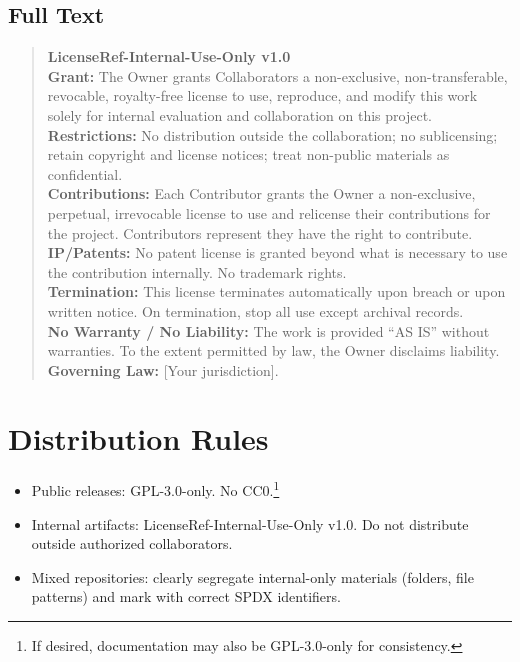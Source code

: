 \documentclass[11pt]{article}
\begin{document}
\subsection*{Full Text}
\begin{quote}\small
\textbf{LicenseRef-Internal-Use-Only v1.0}\\[0.3em]
\textbf{Grant:} The Owner grants Collaborators a non-exclusive, non-transferable, revocable, royalty-free license to use, reproduce, and modify this work solely for internal evaluation and collaboration on this project.\\
\textbf{Restrictions:} No distribution outside the collaboration; no sublicensing; retain copyright and license notices; treat non-public materials as confidential.\\
\textbf{Contributions:} Each Contributor grants the Owner a non-exclusive, perpetual, irrevocable license to use and relicense their contributions for the project. Contributors represent they have the right to contribute.\\
\textbf{IP/Patents:} No patent license is granted beyond what is necessary to use the contribution internally. No trademark rights.\\
\textbf{Termination:} This license terminates automatically upon breach or upon written notice. On termination, stop all use except archival records.\\
\textbf{No Warranty / No Liability:} The work is provided “AS IS” without warranties. To the extent permitted by law, the Owner disclaims liability.\\
\textbf{Governing Law:} [Your jurisdiction].
\end{quote}

\section*{Distribution Rules}
\begin{itemize}[leftmargin=*]
  \item Public releases: GPL-3.0-only. No CC0.\footnote{If desired, documentation may also be GPL-3.0-only for consistency.}
  \item Internal artifacts: LicenseRef-Internal-Use-Only v1.0. Do not distribute outside authorized collaborators.
  \item Mixed repositories: clearly segregate internal-only materials (folders, file patterns) and mark with correct SPDX identifiers.
\end{itemize}
\end{document}

